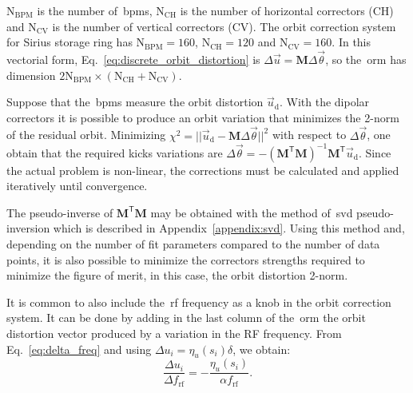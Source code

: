 $\mathrm{N}_{\mathrm{BPM}}$ is the number of~\gls{bpm}s, $\mathrm{N}_{\mathrm{CH}}$ is the number of horizontal correctors (CH) and $\mathrm{N}_{\mathrm{CV}}$ is the number of vertical correctors (CV). The orbit correction system for Sirius storage ring has $\mathrm{N}_{\mathrm{BPM}} = 160$, $\mathrm{N}_{\mathrm{CH}} = 120$ and $\mathrm{N}_{\mathrm{CV}} = 160$.  In this vectorial form, Eq.~\eqref{eq:discrete_orbit_distortion} is $\Delta \vec{u} = \mathbf{M} \Delta \vec{\theta}$, so the~\gls{orm} has dimension $2 \mathrm{N}_{\mathrm{BPM}} \times \left(\mathrm{N}_{\mathrm{CH}} + \mathrm{N}_{\mathrm{CV}}\right)$. 

Suppose that the~\gls{bpm}s measure the orbit distortion $\vec{u}_{\mathrm{d}}$. With the dipolar correctors it is possible to produce an orbit variation that minimizes the 2-norm of the residual orbit. Minimizing $\chi^2 = ||\vec{u}_{\mathrm{d}} - \mathbf{M}\Delta \vec{\theta}||^2$ with respect to $\Delta\vec{\theta}$, one obtain that the required kicks variations are $\Delta \vec{\theta} = -\left(\mathbf{M}^{\mathsf{T}}\mathbf{M}\right)^{-1}\mathbf{M}^{\mathsf{T}}\vec{u}_{\mathrm{d}}$. Since the actual problem is non-linear, the corrections must be calculated and applied iteratively until convergence. 

The pseudo-inverse of $\mathbf{M}^{\mathsf{T}}\mathbf{M}$ may be obtained with the method of~\gls{svd} pseudo-inversion which is described in Appendix~\ref{appendix:svd}. Using this method and, depending on the number of fit parameters compared to the number of data points, it is also possible to minimize the correctors strengths required to minimize the figure of merit, in this case, the orbit distortion 2-norm.

It is common to also include the~\gls{rf} frequency as a knob in the orbit correction system. It can be done by adding in the last column of the~\gls{orm} the orbit distortion vector produced by a variation in the RF frequency. From Eq.~\eqref{eq:delta_freq} and using $\Delta u_i = \eta_u(s_i) \delta$, we obtain:
\begin{equation}
    \dfrac{\Delta u_i}{ \Delta f_{\mathrm{rf}}} = - \dfrac{\eta_u(s_i)}{\alpha f_{\mathrm{rf}}}.
    \label{eq:rf_column}
\end{equation}

